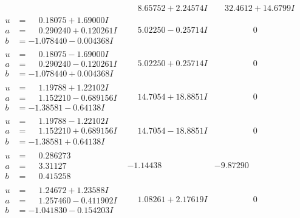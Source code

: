 \documentclass[1p]{elsarticle_modified}
\theoremstyle{definition}
\begin{document}
$$\begin{array}{c|c|c}
 & \phantom{-}8.65752 + 2.24574 I & \phantom{-}32.4612 + 14.6799 I \\ \hline\begin{aligned}
u &= \phantom{-}0.18075 + 1.69000 I \\
a &= \phantom{-}0.290240 + 0.120261 I \\
b &= -1.078440 - 0.004368 I\end{aligned}
 & \phantom{-}5.02250 - 0.25714 I & \phantom{-0.000000 } 0 \\ \hline\begin{aligned}
u &= \phantom{-}0.18075 - 1.69000 I \\
a &= \phantom{-}0.290240 - 0.120261 I \\
b &= -1.078440 + 0.004368 I\end{aligned}
 & \phantom{-}5.02250 + 0.25714 I & \phantom{-0.000000 } 0 \\ \hline\begin{aligned}
u &= \phantom{-}1.19788 + 1.22102 I \\
a &= \phantom{-}1.152210 - 0.689156 I \\
b &= -1.38581 - 0.64138 I\end{aligned}
 & \phantom{-}14.7054 + 18.8851 I & \phantom{-0.000000 } 0 \\ \hline\begin{aligned}
u &= \phantom{-}1.19788 - 1.22102 I \\
a &= \phantom{-}1.152210 + 0.689156 I \\
b &= -1.38581 + 0.64138 I\end{aligned}
 & \phantom{-}14.7054 - 18.8851 I & \phantom{-0.000000 } 0 \\ \hline\begin{aligned}
u &= \phantom{-}0.286273\phantom{ +0.000000I} \\
a &= \phantom{-}3.31127\phantom{ +0.000000I} \\
b &= \phantom{-}0.415258\phantom{ +0.000000I}\end{aligned}
 & -1.14438\phantom{ +0.000000I} & -9.87290\phantom{ +0.000000I} \\ \hline\begin{aligned}
u &= \phantom{-}1.24672 + 1.23588 I \\
a &= \phantom{-}1.257460 - 0.411902 I \\
b &= -1.041830 - 0.154203 I\end{aligned}
 & \phantom{-}1.08261 + 2.17619 I & \phantom{-0.000000 } 0 \\ \hline\begin{aligned}

\end{aligned}
\end{array}$$
\end{document}
